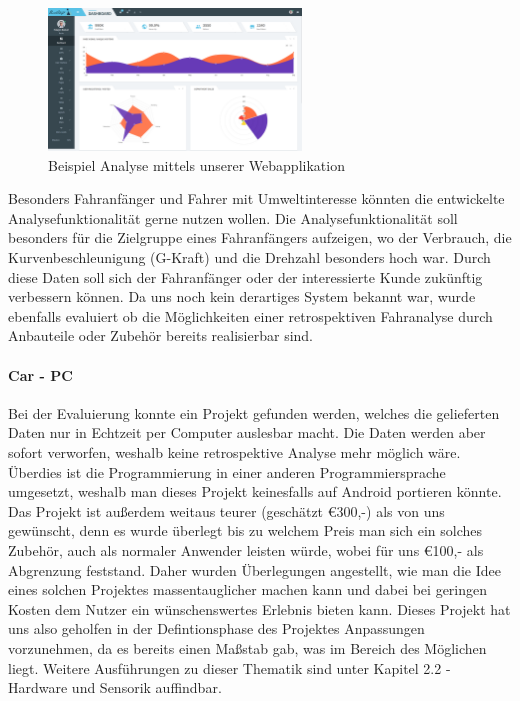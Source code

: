 \begin{figure}[!htb]\centering
	\includegraphics[width=0.6\textwidth]{images/placeholderWebApp}
	\caption{Beispiel Analyse mittels unserer Webapplikation}\label{Fig:imgWebapp}
\end{figure}

Besonders Fahranfänger und Fahrer mit Umweltinteresse könnten die entwickelte Analysefunktionalität gerne nutzen wollen. Die Analysefunktionalität soll besonders für die Zielgruppe eines Fahranfängers aufzeigen, wo der Verbrauch, die Kurvenbeschleunigung (G-Kraft) und die Drehzahl besonders hoch war. Durch diese Daten soll sich der Fahranfänger oder der interessierte Kunde zukünftig verbessern können. Da uns noch kein derartiges System bekannt war, wurde ebenfalls evaluiert ob die Möglichkeiten einer retrospektiven Fahranalyse durch Anbauteile oder Zubehör bereits realisierbar sind.

\paragraph{Car - PC}
Bei der Evaluierung konnte ein Projekt gefunden werden, welches die gelieferten Daten nur in Echtzeit per Computer auslesbar macht. Die Daten werden aber sofort verworfen, weshalb keine retrospektive Analyse mehr möglich wäre. Überdies ist die Programmierung in einer anderen Programmiersprache umgesetzt, weshalb man dieses Projekt keinesfalls auf Android portieren könnte. Das Projekt ist außerdem weitaus teurer (geschätzt €300,-) als von uns gewünscht, denn es wurde überlegt bis zu welchem Preis man sich ein solches Zubehör, auch als normaler Anwender leisten würde, wobei für uns €100,- als Abgrenzung feststand. Daher wurden Überlegungen angestellt, wie man die Idee eines solchen Projektes massentauglicher machen kann und dabei bei geringen Kosten dem Nutzer ein wünschenswertes Erlebnis bieten kann. \cite{SIMR.CH1-Fahrstil-Analyse.LowBudgetCarPC} Dieses Projekt hat uns also geholfen in der Defintionsphase des Projektes Anpassungen vorzunehmen, da es bereits einen Maßstab gab, was im Bereich des Möglichen liegt. Weitere Ausführungen zu dieser Thematik sind unter Kapitel 2.2 - Hardware und Sensorik auffindbar.

